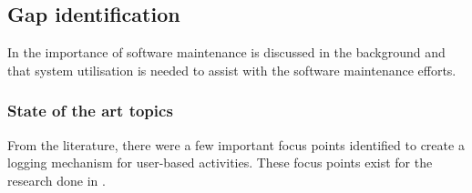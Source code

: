 \subsection{Gap identification}
In  the importance of software maintenance is discussed in the background and that system utilisation is needed to assist with the software maintenance efforts.

\subsubsection{State of the art topics}
From the literature, there were a few important focus points identified to create a logging mechanism for user-based activities. These focus points exist for the research done in .

